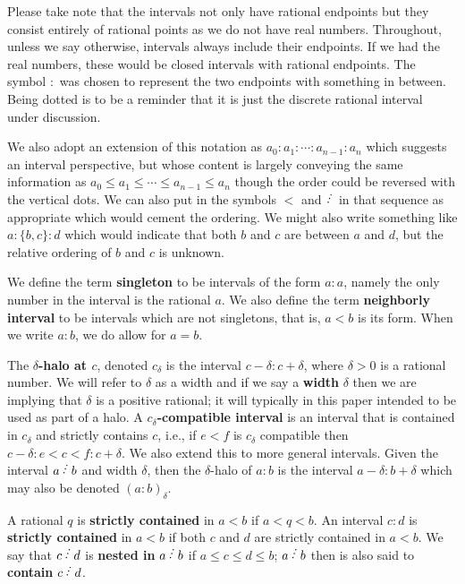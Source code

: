 \documentclass[12pt]{article}
\begin{document}
Please take note that the intervals not only have rational endpoints but they consist entirely of rational points as we do not have real numbers. Throughout, unless we say otherwise, intervals always include their endpoints. If we had the real numbers, these would be closed intervals with rational endpoints.  The symbol $:$ was chosen to represent the two endpoints with something in between. Being dotted is to be a reminder that it is just the discrete rational interval under discussion. 

We also adopt an extension of this notation as $a_0:a_1:\cdots:a_{n-1}:a_n$ which suggests an interval perspective, but whose content is largely conveying the same information as $a_0 \leq a_1 \leq \cdots \leq a_{n-1} \leq a_n$ though the order could be reversed with the vertical dots. We can also put in the symbols $\lt$ and $\lte$ in that sequence as appropriate which would cement the ordering. We might also write something like $a:\{b,c\}:d$ which would indicate that both $b$ and $c$ are between $a$ and $d$, but the relative ordering of $b$ and $c$ is unknown. 

We define the term \textbf{singleton} to be intervals of the form $a:a$, namely the only number in the interval is the rational $a$. We also define the term \textbf{neighborly interval} to be intervals which are not singletons, that is, $a \lt b$ is its form. When we write $a:b$, we do allow for $a=b$. 

The\textbf{ $\delta$-halo at $c$}, denoted $c_{\delta}$ is the interval $c-\delta:c+\delta$, where $\delta>0$ is a rational number. We will refer to $\delta$ as a width and if we say a \textbf{width} $\delta$ then we are implying that $\delta$ is a positive rational; it will typically in this paper intended to be used as part of a halo. A \textbf{$c_{\delta}$-compatible interval} is an interval that is contained in $c_{\delta}$ and strictly contains $c$, i.e., if $e \lt f$ is $c_{\delta}$ compatible then $c-\delta:e\lt c \lt f:c+\delta$.  We also extend this to more general intervals. Given the interval $a\lte b$ and width $\delta$, then the $\delta$-halo of $a:b$ is the interval $a-\delta:b+\delta$ which may also be denoted $(a:b)_\delta$.

A rational $q$ is \textbf{strictly contained} in $a\lt b$ if $a < q < b$. An interval $c:d$ is \textbf{strictly contained} in $a\lt b$ if both $c$ and $d$ are strictly contained in $a \lt b$. We say that $c \lte d$ is \textbf{nested in} $a\lte b$ if $a \leq c \leq d \leq b$; $a \lte b$ then is also said to \textbf{contain} $c \lte d$. 
\end{document}
